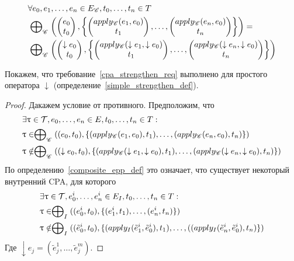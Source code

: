 \begin{itemize}
\begin{equation}
\label{cpa_strengthen_req}
\begin{aligned}
& \forall e_0, e_1, \dots, e_n \in E_{\mathscr{C}}, t_0, \dots, t_n \in T \\
& \mathrel{\bigoplus}_{\mathscr{C}}
\left(
\begin{pmatrix}
e_0 \\
t_0 
\end{pmatrix},
\left\{
\begin{pmatrix}
apply_{\mathscr{C}}(e_1, e_0) \\
t_1 
\end{pmatrix},
\dots ,
\begin{pmatrix}
apply_{\mathscr{C}}(e_n, e_0) \\
t_n 
\end{pmatrix}
\right\}
\right) = \\
& \mathrel{\bigoplus}_{\mathscr{C}}
\left(
\begin{pmatrix}
\downarrow e_0 \\
t_0 
\end{pmatrix},
\left\{
\begin{pmatrix}
apply_{\mathscr{C}}(\downarrow e_1, \downarrow e_0) \\
t_1 
\end{pmatrix},
\dots ,
\begin{pmatrix}
apply_{\mathscr{C}}(\downarrow e_n, \downarrow e_0) \\
t_n 
\end{pmatrix}
\right\}
\right)
\end{aligned}
\end{equation}

Покажем, что требование~\ref{cpa_strengthen_req} выполнено для простого оператора $\downarrow$ (определение~\ref{simple_strengthen_def}).

\begin{proof}
Дакажем условие от противного.
Предположим, что 
\begin{align*}
& \exists \uptau \in \mathcal{T}, e_0, \dots, e_n \in E, t_0, \dots, t_n \in T : \\
& \uptau \in \mathrel{\bigoplus}_{\mathscr{C}}((e_0, t_0), \{(apply_{\mathscr{C}}(e_1, e_0), t_1), \dots, (apply_{\mathscr{C}}(e_n, e_0), t_n)\}) \\
& \uptau \notin \mathrel{\bigoplus}_{\mathscr{C}}((\downarrow e_0, t_0), \{(apply_{\mathscr{C}}(\downarrow e_1, \downarrow e_0), t_1), \dots, (apply_{\mathscr{C}}(\downarrow e_n, \downarrow e_0), t_n)\}) 
\end{align*}
По определению~\ref{composite_epp_def} это означает, что существует некоторый внутренний CPA, для которого 
\begin{align*}
& \exists \uptau \in \mathcal{T}, e^i_0, \dots, e^i_n \in E_I, t_0, \dots, t_n \in T : \\
& \uptau \in \mathrel{\bigoplus}_{I}((e^i_0, t_0), \{(e^i_1, t_1), \dots, (e^i_n, t_n)\}) \\
& \uptau \notin \mathrel{\bigoplus}_{I}((\tilde{e}^i_0, t_0), \{(apply_{I}(\tilde{e}^i_1, \tilde{e}^i_0), t_1), \dots, ((apply_{I}(\tilde{e}^i_n, \tilde{e}^i_0), t_n)\}) 
\end{align*}
Где $\downarrow e_j = (\tilde{e}^1_j, \dots, \tilde{e}^m_j)$.


\end{proof}
\end{itemize}
